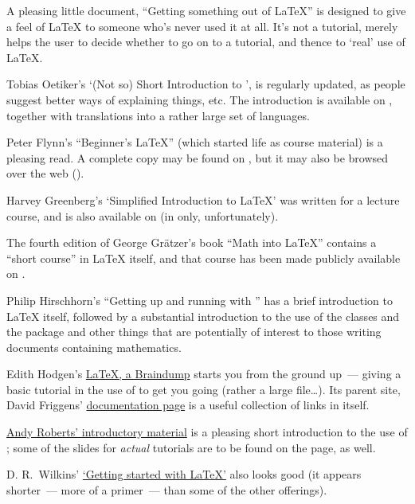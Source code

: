 
A pleasing little document, ``Getting something out of \LaTeX{}'' is
designed to give a feel of \LaTeX{} to someone who's never used it at
all.  It's not a tutorial, merely helps the user to decide whether to
go on to a tutorial, and thence to `real' use of \LaTeX{}.

Tobias Oetiker's `(Not so) Short Introduction to \LaTeXe{}', is
regularly updated, as people suggest better ways of explaining things,
etc.  The introduction is available on , together with
translations into a rather large set of languages.

Peter Flynn's ``Beginner's \LaTeX{}'' (which started life as course
material) is a pleasing read.  A complete copy may be found on
, but it may also be browsed over the web
().

Harvey Greenberg's `Simplified Introduction to \LaTeX{}' was written
for a lecture course, and is also available on  (in \PS{}
only, unfortunately).

The fourth edition of George Gr\"atzer's book ``Math into \LaTeX{}''
contains a ``short course'' in \LaTeX{} itself, and that course has
been made publicly available on .

Philip Hirschhorn's ``Getting up and running with \AMSLaTeX{}'' has a
brief introduction to \LaTeX{} itself, followed by a substantial
introduction to the use of the  classes and the
 package and other things that are potentially of
interest to those writing documents containing mathematics.

Edith Hodgen's %
\href{http://www.mcs.vuw.ac.nz/~david/latex/notes.pdf}{\LaTeX{}, a Braindump}
starts you from the ground up~--- giving a basic tutorial in the use
of  to get you going (rather a large file\dots{}).
Its parent site, David Friggens' %
\href{http://www.mcs.vuw.ac.nz/~david/latex/}{documentation page} is a
useful collection of links in itself.

\href{http://www.andy-roberts.net/misc/latex/}{Andy Roberts' introductory material}
is a pleasing short introduction to the use of \AllTeX{}; some of the
slides for \emph{actual} tutorials are to be found on the page, as
well.

D. R.~Wilkins' %
\href{http://www.maths.tcd.ie/~dwilkins/LaTeXPrimer/}{`Getting started with \LaTeX{}'}
also looks good (it appears shorter~--- more of a primer~--- than some
of the other offerings).

